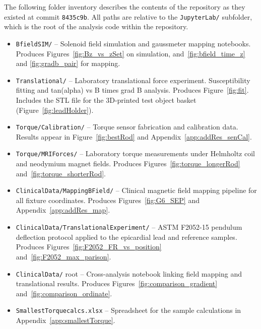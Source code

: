 \vspace{1em}

\noindent The following folder inventory describes the contents of the repository
as they existed at commit \texttt{8435c9b}. All paths are relative to the
\texttt{JupyterLab/} subfolder, which is the root of the analysis code within
the repository.

\vspace{0.5em}

\begin{itemize}
    \item \texttt{BfieldSIM/} -- Solenoid field simulation and gaussmeter mapping
    notebooks. Produces Figures~\ref{fig:Bz_vs_zSet} on simulation, and~\ref{fig:bfield_time_z} and \ref{fig:gradb_pair} for mapping.

    \item \texttt{Translational/} -- Laboratory translational force experiment.
    Susceptibility fitting and tan(alpha) vs B times grad B analysis. Produces
    Figure~\ref{fig:fit}. Includes the STL file for the 3D-printed test object
    basket (Figure~\ref{fig:leadHolder}).

    \item \texttt{Torque/Calibration/} -- Torque sensor fabrication and calibration
    data. Results appear in Figure~\ref{fig:bestRod} and
    Appendix~\ref{app:addRes_senCal}.

    \item \texttt{Torque/MRIForces/} -- Laboratory torque measurements under
    Helmholtz coil and neodymium magnet fields. Produces
    Figures~\ref{fig:torque_longerRod} and~\ref{fig:torque_shorterRod}.

    \item \texttt{ClinicalData/MappingBField/} -- Clinical magnetic field mapping
    pipeline for all fixture coordinates. Produces
    Figures~\ref{fig:G6_SEP}  and
    Appendix~\ref{app:addRes_map}.

    \item \texttt{ClinicalData/TranslationalExperiment/} -- ASTM F2052-15 pendulum
    deflection protocol applied to the epicardial lead and reference samples.
    Produces Figures~\ref{fig:F2052_FR_vs_position} and~\ref{fig:F2052_max_parison}.

    \item \texttt{ClinicalData/} root -- Cross-analysis notebook linking field
    mapping and translational results. Produces Figures~\ref{fig:comparison_gradient}
    and~\ref{fig:comparison_ordinate}.

    \item \texttt{SmallestTorquecalcs.xlsx} -- Spreadsheet for the sample
    calculations in Appendix~\ref{app:smallestTorque}.
\end{itemize}
